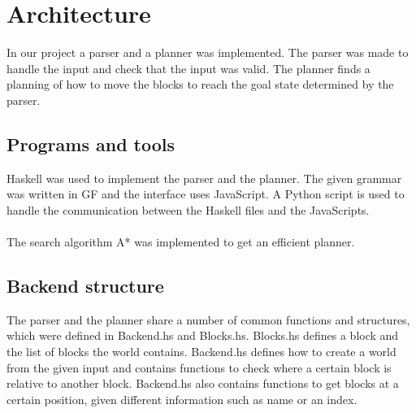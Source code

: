 \chapter{Architecture}
In our project a parser and a planner was implemented. The parser was made to handle the input and check that the input was valid. The planner finds a planning of how to move the blocks to reach the goal state determined by the parser. 

\section{Programs and tools}
Haskell was used to implement the parser and the planner. The given grammar was written in GF and the interface uses JavaScript. A Python script is used to handle the communication between the Haskell files and the JavaScripts.\\\\
The search algorithm A* was implemented to get an efficient planner.

\section{Backend structure}
The parser and the planner share a number of common functions and structures, which were defined in Backend.hs and Blocks.hs. Blocks.hs defines a block and the list of blocks the world contains. Backend.hs defines how to create a world from the given input and contains functions to check where a certain block is relative to another block. Backend.hs also contains functions to get blocks at a certain position, given different information such as name or an index. 

